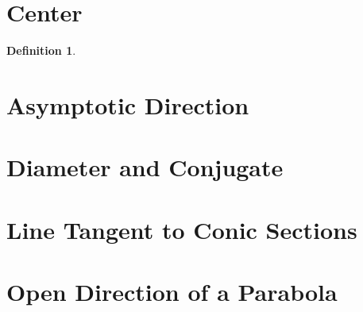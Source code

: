 \documentclass[onecolumn]{ctexart}
\newtheorem{definition}{Definition}
\begin{document}
\section{Center}

\begin{definition}
  
\end{definition}

\section{Asymptotic Direction}

\section{Diameter and Conjugate}

\section{Line Tangent to Conic Sections}

\section{Open Direction of a Parabola}
\end{document}
